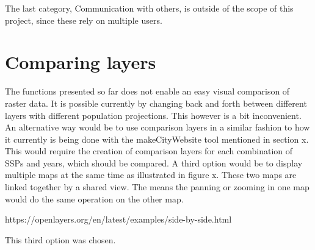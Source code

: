 The last category, Communication with others, is outside of the scope of this project, since these rely on multiple users. %




\section{Comparing layers}

The functions presented so far does not enable an easy visual comparison of raster data. It is possible currently by changing back and forth between different layers with different population projections. This however is a bit inconvenient. 
An alternative way would be to use comparison layers in a similar fashion to how it currently is being done with the makeCityWebsite tool mentioned in section x. This would require the creation of comparison layers for each combination of SSPs and years, which should be compared.   
A third option would be to display multiple maps at the same time as illustrated in figure x. These two maps are linked together by a shared view. The means the panning or zooming in one map would do the same operation on the other map.


https://openlayers.org/en/latest/examples/side-by-side.html

This third option was chosen.

